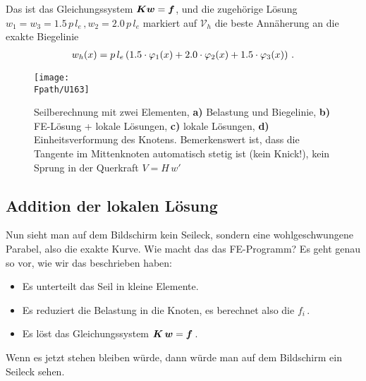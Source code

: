 Das ist das Gleichungssystem $ \mbox{\boldmath $K$} \mbox{\boldmath $w$} = \mbox{\boldmath $f$} $,
und die zugeh\"{o}rige L\"{o}sung $w_1 = w_3 = 1.5\,p\,l_e\,, w_2 = 2.0\,p\,l_e$ markiert auf $\mathcal{V}_h$ die beste Ann\"{a}herung an die exakte Biegelinie
\begin{align}\label{A11Resultat}
w_{h}(x) = p\, l_e \left(1.5 \cdot \varphi_1(x) + 2.0 \cdot \varphi_2(x) + 1.5 \cdot \varphi_3(x)\right)\,.
\end{align}
\begin{figure}[tbp] \centering
\centering
\if {} \sidecaption[t] \fi
\texttt{[image: \\Fpath/U163]}
\caption{Seilberechnung mit zwei Elementen,  \textbf{a)} Belastung und Biegelinie, \textbf{ b)} FE-L\"{o}sung + lokale L\"{o}sungen, \textbf{ c)} lokale L\"{o}sungen, \textbf{ d)} Einheitsverformung des Knotens. Bemerkenswert ist, dass die Tangente im Mittenknoten automatisch stetig ist (kein Knick!), kein Sprung in der Querkraft $V = H\,w'$} \label{U163}
\end{figure}%
\vspace{-0.1cm}
{\textcolor{sectionTitleBlue}{\section{Addition der lokalen L\"{o}sung}}}
Nun sieht man auf dem Bildschirm kein Seileck, sondern eine wohlgeschwungene Parabel, also die exakte Kurve. Wie macht das das FE-Programm? Es geht genau so vor, wie wir das beschrieben haben:\\

\begin{itemize}
  \item Es unterteilt das Seil in kleine Elemente.
  \item Es reduziert die Belastung in die Knoten, es berechnet also die $f_i$\,.
  \item Es l\"{o}st das Gleichungssystem $\mbox{\boldmath $K$}\,\mbox{\boldmath $w$} = \mbox{\boldmath $f$}$\,.
\end{itemize}
Wenn es jetzt stehen bleiben w\"{u}rde, dann w\"{u}rde man auf dem Bildschirm ein Seileck sehen.

